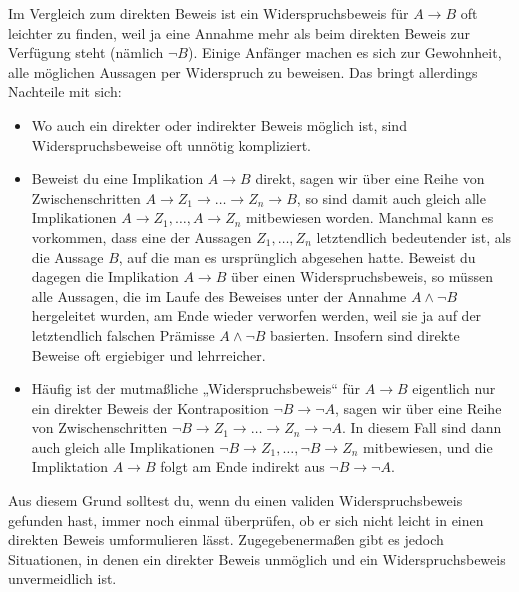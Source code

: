  
\begin{bem}
    Im Vergleich zum direkten Beweis ist ein Widerspruchsbeweis für $A\to B$ oft leichter zu finden, weil ja eine Annahme mehr als beim direkten Beweis zur Verfügung steht (nämlich $\neg B$). Einige Anfänger machen es sich zur Gewohnheit, alle möglichen Aussagen per Widerspruch zu beweisen. Das bringt allerdings Nachteile mit sich:
    \begin{itemize}
        \item Wo auch ein direkter oder indirekter Beweis möglich ist, sind Widerspruchsbeweise oft unnötig kompliziert.
        \item Beweist du eine Implikation $A\to B$ direkt, sagen wir über eine Reihe von Zwischenschritten $A\to Z_1\to\ldots\to Z_n\to B$, so sind damit auch gleich alle Implikationen $A\to Z_1,\dots , A\to Z_n$ mitbewiesen worden. Manchmal kann es vorkommen, dass eine der Aussagen $Z_1,\dots , Z_n$ letztendlich bedeutender ist, als die Aussage $B$, auf die man es ursprünglich abgesehen hatte. Beweist du dagegen die Implikation $A\to B$ über einen Widerspruchsbeweis, so müssen alle Aussagen, die im Laufe des Beweises unter der Annahme $A\land \neg B$ hergeleitet wurden, am Ende wieder verworfen werden, weil sie ja auf der letztendlich falschen Prämisse $A\land \neg B$ basierten. Insofern sind direkte Beweise oft ergiebiger und lehrreicher.
        \item Häufig ist der mutmaßliche „Widerspruchsbeweis“ für $A\to B$ eigentlich nur ein direkter Beweis der Kontraposition $\neg B\to \neg A$, sagen wir über eine Reihe von Zwischenschritten $\neg B \to Z_1\to\ldots\to Z_n\to \neg A$. In diesem Fall sind dann auch gleich alle Implikationen $\neg B\to Z_1,\dots , \neg B\to Z_n$ mitbewiesen, und die Impliktation $A\to B$ folgt am Ende indirekt aus $\neg B\to \neg A$.
    \end{itemize}
    Aus diesem Grund solltest du, wenn du einen validen Widerspruchsbeweis gefunden hast, immer noch einmal überprüfen, ob er sich nicht leicht in einen direkten Beweis umformulieren lässt. Zugegebenermaßen gibt es jedoch Situationen, in denen ein direkter Beweis unmöglich und ein Widerspruchsbeweis unvermeidlich ist.
\end{bem}
  
